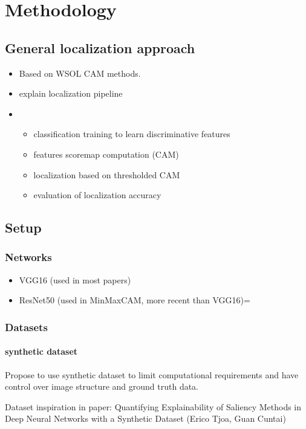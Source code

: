 \chapter{Methodology}

\section{General localization approach}
\begin{itemize}
    \item Based on WSOL CAM methods.
    \item explain localization pipeline
    \item 
        \begin{itemize}
        \item classification training to learn discriminative features
        \item features scoremap computation (CAM)
        \item localization based on thresholded CAM
        \item evaluation of localization accuracy 
        \end{itemize}
\end{itemize}

\section{Setup}

\subsection{Networks}
\begin{itemize}
    \item VGG16 (used in most papers)
    \item ResNet50 (used in MinMaxCAM, more recent than VGG16)=
\end{itemize}

\subsection{Datasets}
\subsubsection{synthetic dataset}
Propose to use synthetic dataset to limit computational requirements and have control over image structure and ground truth data.

Dataset inspiration in paper: Quantifying Explainability of Saliency Methods in Deep Neural Networks with a Synthetic Dataset (Erico Tjoa, Guan Cuntai)

